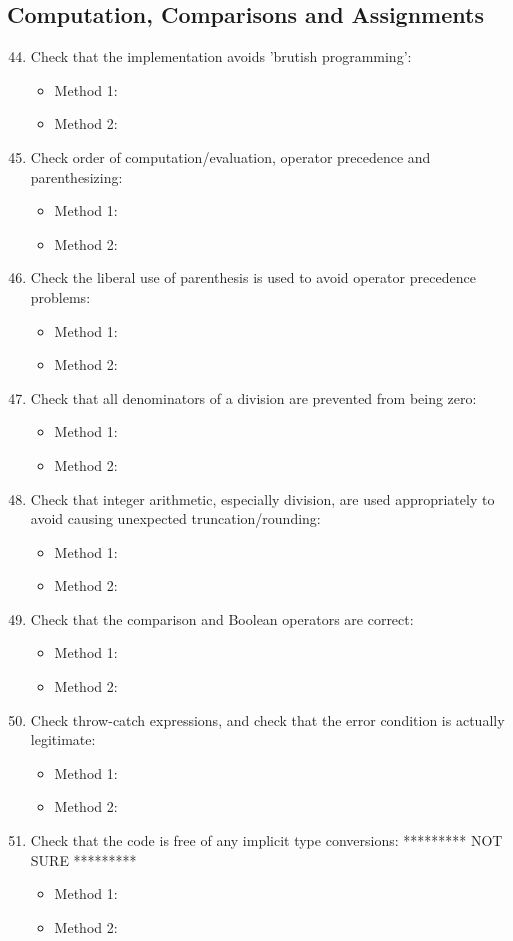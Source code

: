 \subsection{Computation, Comparisons and Assignments}
\begin{enumerate}
	\setcounter{enumi}{43}
	\item Check that the implementation avoids 'brutish programming':
	\begin{itemize}
		\item Method 1: \cmark
		\item Method 2:
	\end{itemize}
	\item Check order of computation/evaluation, operator precedence and parenthesizing:
	\begin{itemize}
		\item Method 1: \cmark
		\item Method 2:
	\end{itemize}
	\item Check the liberal use of parenthesis is used to avoid operator precedence problems:
	\begin{itemize}
		\item Method 1: \cmark
		\item Method 2: 
	\end{itemize}
	\item Check that all denominators of a division are prevented from being zero:
	\begin{itemize}
		\item Method 1: \cmark
		\item Method 2:
	\end{itemize}
	\item Check that integer arithmetic, especially division, are used appropriately to avoid causing unexpected truncation/rounding:
	\begin{itemize}
		\item Method 1: \cmark
		\item Method 2:
	\end{itemize}
	\item Check that the comparison and Boolean operators are correct:
	\begin{itemize}
		\item Method 1: \cmark
		\item Method 2: 
	\end{itemize}
	\item Check throw-catch expressions, and check that the error condition is actually legitimate:
	\begin{itemize}
		\item Method 1: \cmark
		\item Method 2: 
	\end{itemize}
	\item Check that the code is free of any implicit type conversions: ********* NOT SURE *********
	\begin{itemize}
		\item Method 1: 
		\item Method 2: 
	\end{itemize}
\end{enumerate}